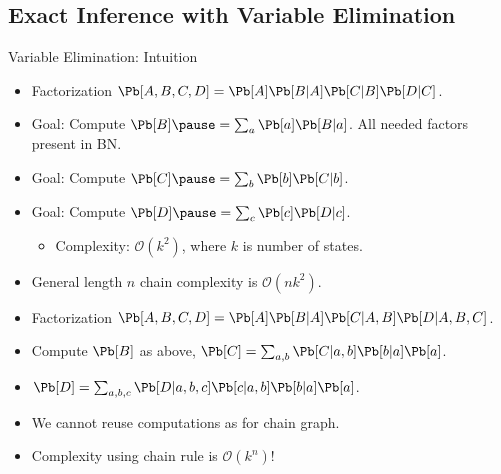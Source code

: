 \subsection{Exact Inference with Variable Elimination}

\begin{frame}{Variable Elimination: Intuition}
    \begin{example}

    \begin{itemize}
        \pause \item Factorization $\Pb[A,B,C,D] = \Pb[A] \Pb[B | A] \Pb[C | B] \Pb[D | C]$.
    \pause \item Goal: Compute $\Pb[B] \pause = \sum_a \Pb[a] \Pb[B | a]$. \pause All needed factors present in BN.
    \pause \item Goal: Compute $\Pb[C] \pause = \sum_b \Pb[b] \Pb[C | b]$. 
    \pause \item Goal: Compute $\Pb[D] \pause = \sum_c \Pb[c] \Pb[D | c]$. 
    \begin{itemize}
    \pause \item Complexity: $\mathcal{O}(k^2)$, where $k$ is number of states.
    \end{itemize}
    \pause \item General length $n$ chain complexity is \pause $\mathcal{O}(n k^2)$.
    \end{itemize}
    \end{example}
\pause
    \begin{example}
    \begin{itemize}
        \pause \item Factorization $\Pb[A,B,C,D] = \Pb[A] \Pb[B | A] \Pb[C | A, B] \Pb[D | A,B,C]$.
        \pause \item Compute $\Pb[B]$ as above, $\Pb[C] = \sum_{a,b} \Pb[C | a,b] \Pb[b | a] \Pb[a]$.
        \pause \item $\Pb[D] = \sum_{a,b,c} \Pb[D | a,b,c] \Pb[c | a, b] \Pb[b | a] \Pb[a]$.
        \pause \item We cannot reuse computations as for chain graph.
    \pause \item Complexity using chain rule is \pause $\mathcal{O}(k^n)$!
    \end{itemize}
\end{example}
\end{frame}

